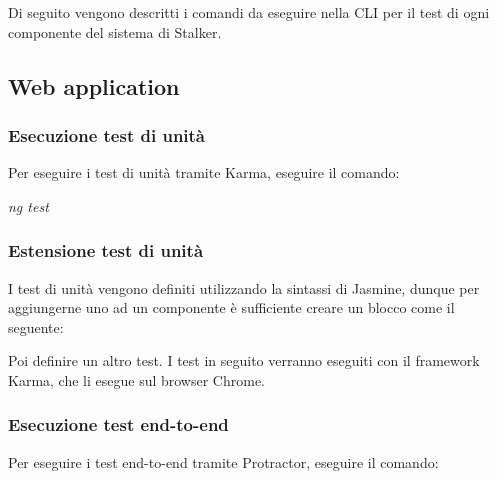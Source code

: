 \documentclass[../manuale-manutentore.tex]{subfiles}
\begin{document}
Di seguito vengono descritti i comandi da eseguire nella CLI per il test di ogni componente del sistema di Stalker.


\subsection{Web application}%
\label{sub:}

\subsubsection{Esecuzione test di unità}%
\label{subs:esecuzione_test_di_unita}

Per eseguire i test di unità tramite Karma, eseguire il comando: \par\bigskip

\begin{center}
  \textit{ng test}
\end{center}
\par\bigskip

\subsubsection{Estensione test di unità}%
\label{subs:estensione_test_unita_webapp}

I test di unità vengono definiti utilizzando la sintassi di Jasmine, dunque per aggiungerne uno ad un componente è sufficiente creare un blocco come il seguente:

\newline
Poi definire un altro test.
I test in seguito verranno eseguiti con il framework Karma, che li esegue sul browser Chrome.

\subsubsection{Esecuzione test end-to-end}%
\label{subs:esecuzione_test_end_to_end}

Per eseguire i test end-to-end tramite Protractor, eseguire il comando: \par\bigskip
\end{document}

